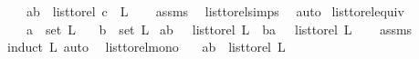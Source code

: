 \begin{isabellebody}
\ \ \ {\isachardoublequoteopen}{\isacharparenleft}{\kern0pt}a{\isacharcomma}{\kern0pt}b{\isacharparenright}{\kern0pt}\ {\isasymnotin}\ list{\isacharunderscore}{\kern0pt}to{\isacharunderscore}{\kern0pt}rel\ {\isacharparenleft}{\kern0pt}c\ {\isacharhash}{\kern0pt}\ L{\isacharparenright}{\kern0pt}{\isachardoublequoteclose}\isanewline
%
\isadelimproof
\ \ %
\endisadelimproof
%
\isatagproof
{}\isamarkupfalse%
\ assms\ \isamarkupfalse%
\ list{\isacharunderscore}{\kern0pt}to{\isacharunderscore}{\kern0pt}rel{\isachardot}{\kern0pt}simps\ \isamarkupfalse%
\ auto%
\endisatagproof
{\isafoldproof}%
%
\isadelimproof
\isanewline
%
\endisadelimproof
\isanewline
{}\isamarkupfalse%
\ list{\isacharunderscore}{\kern0pt}to{\isacharunderscore}{\kern0pt}rel{\isacharunderscore}{\kern0pt}equiv{\isacharcolon}{\kern0pt}\isanewline
\ \ \ {\isachardoublequoteopen}a\ {\isasymin}\ set\ L{\isachardoublequoteclose}\isanewline
\ \ \ {\isachardoublequoteopen}b\ {\isasymin}\ set\ L{\isachardoublequoteclose}\isanewline
{}\ {\isachardoublequoteopen}{\isacharparenleft}{\kern0pt}a{\isacharcomma}{\kern0pt}b{\isacharparenright}{\kern0pt}\ {\isasymin}\ \ list{\isacharunderscore}{\kern0pt}to{\isacharunderscore}{\kern0pt}rel\ {\isacharparenleft}{\kern0pt}L{\isacharparenright}{\kern0pt}{\isachardoublequoteclose}\ {\isacharbar}{\kern0pt}\ {\isachardoublequoteopen}{\isacharparenleft}{\kern0pt}b{\isacharcomma}{\kern0pt}a{\isacharparenright}{\kern0pt}\ {\isasymin}\ \ list{\isacharunderscore}{\kern0pt}to{\isacharunderscore}{\kern0pt}rel\ {\isacharparenleft}{\kern0pt}L{\isacharparenright}{\kern0pt}{\isachardoublequoteclose}\isanewline
%
\isadelimproof
\ \ %
\endisadelimproof
%
\isatagproof
{}\isamarkupfalse%
\ assms\isanewline
{}\isamarkupfalse%
{\isacharparenleft}{\kern0pt}induct\ L{\isacharcomma}{\kern0pt}\ auto{\isacharparenright}{\kern0pt}\ \isamarkupfalse%
%
\endisatagproof
{\isafoldproof}%
%
\isadelimproof
\isanewline
%
\endisadelimproof
\isanewline
{}\isamarkupfalse%
\ list{\isacharunderscore}{\kern0pt}to{\isacharunderscore}{\kern0pt}rel{\isacharunderscore}{\kern0pt}mono{}{\isacharcolon}{\kern0pt}\isanewline
\ \ \ {\isachardoublequoteopen}{\isacharparenleft}{\kern0pt}a{\isacharcomma}{\kern0pt}b{\isacharparenright}{\kern0pt}\ {\isasymin}\ list{\isacharunderscore}{\kern0pt}to{\isacharunderscore}{\kern0pt}rel\ {\isacharparenleft}{\kern0pt}L{}{\isacharparenright}{\kern0pt}{\isachardoublequoteclose}\isanewline

\end{isabellebody}
